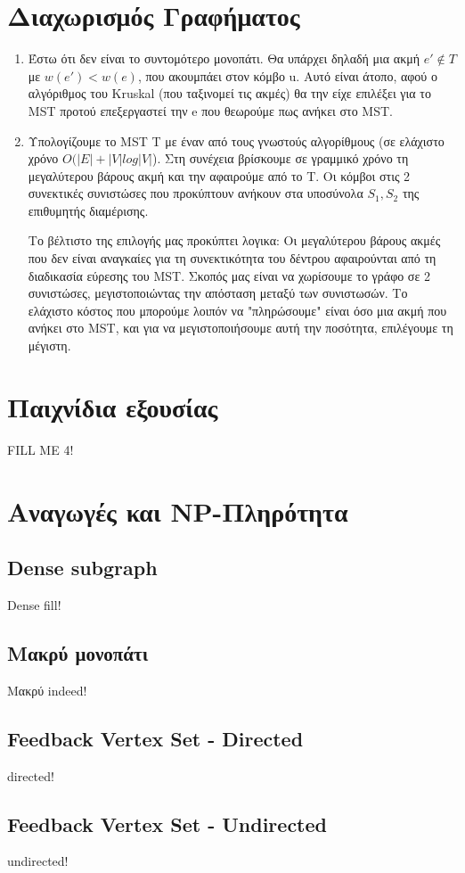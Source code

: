 \documentclass[a4paper,11pt]{article}
\begin{document}

\section{Διαχωρισμός Γραφήματος}

\begin{enumerate}
\item Έστω ότι δεν είναι το συντομότερο μονοπάτι. Θα υπάρχει δηλαδή μια ακμή
$e' \notin T$ με $w(e') < w(e)$, που ακουμπάει στον κόμβο u. Αυτό είναι άτοπο,
αφού ο αλγόριθμος του Kruskal (που ταξινομεί τις ακμές) θα την είχε επιλέξει
για το MST προτού επεξεργαστεί την e που θεωρούμε πως ανήκει στο MST.
\item Υπολογίζουμε το MST T με έναν από τους γνωστούς αλγορίθμους (σε ελάχιστο
χρόνο $O(|E| + |V|log|V|$). Στη συνέχεια βρίσκουμε σε γραμμικό χρόνο τη
μεγαλύτερου βάρους ακμή και την αφαιρούμε από το T. Οι κόμβοι στις 2
συνεκτικές συνιστώσες που προκύπτουν ανήκουν στα υποσύνολα $S_1, S_2$ της
επιθυμητής διαμέρισης.

Το βέλτιστο της επιλογής μας προκύπτει λογικα: Οι μεγαλύτερου βάρους ακμές που
δεν είναι αναγκαίες για τη συνεκτικότητα του δέντρου αφαιρούνται από τη
διαδικασία εύρεσης του MST. Σκοπός μας είναι να χωρίσουμε το γράφο σε 2
συνιστώσες, μεγιστοποιώντας την απόσταση μεταξύ των συνιστωσών. Το ελάχιστο
κόστος που μπορούμε λοιπόν να "πληρώσουμε" είναι όσο μια ακμή που ανήκει στο
MST, και για να μεγιστοποιήσουμε αυτή την ποσότητα, επιλέγουμε τη μέγιστη.
\end{enumerate}


\section{Παιχνίδια εξουσίας}
FILL ME 4!


\section{Αναγωγές και NP-Πληρότητα}
\subsection{Dense subgraph}
Dense fill!
\subsection{Μακρύ μονοπάτι}
Μακρύ indeed!
\subsection{Feedback Vertex Set - Directed}
directed!
\subsection{Feedback Vertex Set - Undirected}
undirected!

\end{document}

